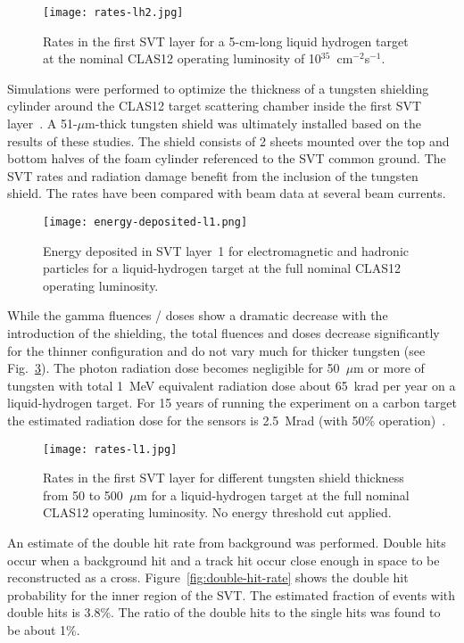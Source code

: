 \begin{figure}[hbt] 
\texttt{[image: rates-lh2.jpg]}
\caption{Rates in the first SVT layer for a 5-cm-long liquid hydrogen target at the nominal CLAS12 operating
  luminosity of 10$^{35}$~cm$^{-2}$s$^{-1}$.}
\label{fig:rates-lh2}
\end{figure}

Simulations were performed to optimize the thickness of a tungsten shielding cylinder around the CLAS12
target scattering chamber inside the first SVT layer~\cite{SHIELDNOTE}. A 51-$\mu$m-thick tungsten shield
was ultimately installed based on the results of these studies. The shield consists of 2 sheets mounted over the
top and bottom halves of the foam cylinder referenced to the SVT common ground. The SVT rates and radiation
damage benefit from the inclusion of the tungsten shield. The rates have been compared with beam data at
several beam currents.

\begin{figure}[hbt] 
\centering 
\texttt{[image: energy-deposited-l1.png]}
\caption{Energy deposited in SVT layer~1 for electromagnetic and hadronic particles for a liquid-hydrogen
  target at the full nominal CLAS12 operating luminosity.}
\label{fig:energy-deposited-l1}
\end{figure}

While the gamma fluences / doses show a dramatic decrease with the introduction of the shielding, the total
fluences and doses decrease significantly for the thinner configuration and do not vary much for thicker tungsten
(see Fig.~\ref{fig:rates-l1}). The photon radiation dose becomes negligible for 50~$\mu$m or more of tungsten
with total 1~MeV equivalent radiation dose about 65~krad per year on a liquid-hydrogen target. For 15 years of
running the experiment on a carbon target the estimated radiation dose for the sensors is 2.5~Mrad (with 50\%
operation)~\cite{TDRSVT}. 

\begin{figure}[hbt] 
\centering 
\texttt{[image: rates-l1.jpg]}
\caption{Rates in the first SVT layer for different tungsten shield thickness from 50 to 500~$\mu$m for a
  liquid-hydrogen target at the full nominal CLAS12 operating luminosity. No energy threshold cut applied.}
\label{fig:rates-l1}
\end{figure}

An estimate of the double hit rate from background was performed. Double hits occur when a background hit and
a track hit occur close enough in space to be reconstructed as a cross. Figure~\ref{fig:double-hit-rate} shows the
double hit probability for the inner region of the SVT. The estimated fraction of events with
double hits is 3.8\%. The ratio of the double hits to the single hits was found to be about 1\%.

